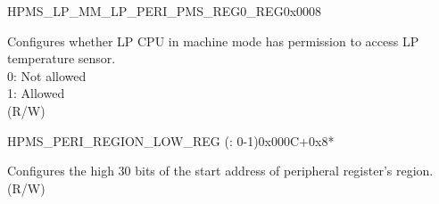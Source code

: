\addtocounter{Regfloat}{-1}
\begin{register}{H}{PMS\_LP\_MM\_LP\_PERI\_PMS\_REG0\_REG}{0x0008}
\begin{regdesc}\begin{reglist}
\item [Continued from the previous page...]

\label{fielddesc:PMSLPMMLPTSENSALLOW}\item [PMS\_LP\_MM\_LP\_TSENS\_ALLOW] Configures whether LP CPU in machine mode has permission to access LP temperature sensor. \\
0: Not allowed \\
1: Allowed \\ (R/W)

\end{reglist}\end{regdesc}
\end{register}


\begin{register}{H}{PMS\_PERI\_REGION\_LOW\_REG (: 0-1)}{0x000C+0x8*}\label{regdesc:PMSPERIREGIONNLOWREG}
%
%
\regnewline%
\begin{regdesc}\begin{reglist}
\label{fielddesc:PMSPERIREGIONNLOW}\item [PMS\_PERI\_REGION\regindex{n}\_LOW] Configures the high 30 bits of the start address of peripheral register's region. (R/W)
\end{reglist}\end{regdesc}
\end{register}


